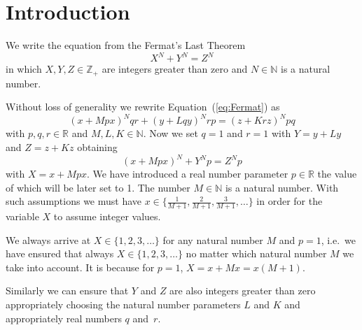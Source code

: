 \documentclass[12pt]{article}
\numberwithin{equation}{section}
\begin{document}
\section{Introduction}\label{sec:intro}

We write the equation from the Fermat's Last Theorem~\cite{FLT_Wikipedia}
\begin{equation}
\label{eq:Fermat}
X^N + Y^N = Z^N
\end{equation}
in which
$X, Y, Z \in \mathbb{Z_{+}}$ are integers
greater than zero
and $N \in \mathbb{N}$ is a natural number.

Without loss of generality we rewrite Equation~(\ref{eq:Fermat}) as
\begin{equation}
  \label{eq:FermatGeneralEquation}
  (x + Mpx)^{N} qr + (y + Lqy)^{N} rp = (z + Krz)^{N} pq
  \end{equation}
with $p, q, r \in \mathbb{R}$
and $M, L, K \in \mathbb{N}$\@.
Now we set $q=1$ and $r=1$
with $Y = y + Ly$ and $Z = z + Kz$
obtaining
\begin{equation}
\label{eq:FermatEquation}
(x + Mpx)^N + Y^N p = Z^N p
\end{equation}
with $X=x + Mpx$.
We have introduced a real number parameter $p \in \mathbb{R}$ the value of which will 
be later set to 1\@.
The number $M \in \mathbb{N}$ is a natural number.
With such assumptions we must have $x \in \{ \frac{1}{M+1}, \frac{2}{M+1}, \frac{3}{M+1}, \ldots \}$
in order for the variable $X$ to assume integer values.




We always arrive at $X \in \{1, 2, 3, \ldots \}$ for any natural number $M$ and $p=1$,
i.e.~we have ensured that always $X \in \{1, 2, 3, \ldots \}$ no matter which natural number $M$ we take
into account. It is because for $p=1$, $X = x + Mx = x(M+1)$\@.

Similarly we can ensure that $Y$ and $Z$ are also integers greater than zero
appropriately choosing the natural number parameters $L$ and $K$ and appropriately real numbers $q$ and~$r$\@.
\end{document}
